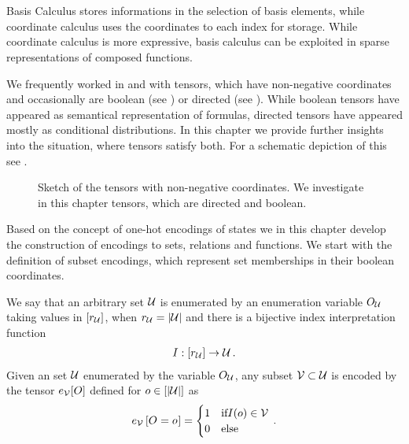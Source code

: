 \chapter{\chatextbasisCalculus}\label{cha:basisCalculus}

Basis Calculus stores informations in the selection of basis elements, while coordinate calculus uses the coordinates to each index for storage.
While coordinate calculus is more expressive, basis calculus can be exploited in sparse representations of composed functions.


We frequently worked in  and  with tensors, which have non-negative coordinates and occasionally are boolean (see ) or directed (see ).
While boolean tensors have appeared as semantical representation of formulas, directed tensors have appeared mostly as conditional distributions.
In this chapter we provide further insights into the situation, where tensors satisfy both.
For a schematic depiction of this see .

\begin{figure}[h]
	\begin{center}
		
	\end{center}
	\caption{Sketch of the tensors with non-negative coordinates.
	We investigate in this chapter tensors, which are directed and boolean.}\label{fig:dbTensorSketch}
\end{figure}




Based on the concept of one-hot encodings of states we in this chapter develop the construction of encodings to sets, relations and functions.
We start with the definition of subset encodings, which represent set memberships in their boolean coordinates.

\begin{definition}\label{def:subsetEncoding}
	We say that an arbitrary set $\mathcal{U}$ is enumerated by an enumeration variable $O_{\mathcal{U}}$ taking values in $[r_{\mathcal{U}}]$, when $r_{\mathcal{U}}=\left|\mathcal{U}\right|$ and there is a bijective index interpretation function
	\begin{align*}
		I : [r_{\mathcal{U}}] \rightarrow \mathcal{U} \, .
	\end{align*}
	Given an set $\mathcal{U}$ enumerated by the variable $O_{\mathcal{U}}$, any subset $\mathcal{V}\subset\mathcal{U}$ is encoded by the tensor $e_{\mathcal{V}}[O]$ defined for $o\in[\left|\mathcal{U}\right|]$ as
	\begin{align*}
	 	e_{\mathcal{V}}\left[O_{}=o_{}\right]
		= \begin{cases}
		1 & \text{if} I(o) \in \mathcal{V} \\
		0 & \text{else}
		\end{cases} \, .
	\end{align*}
\end{definition}

